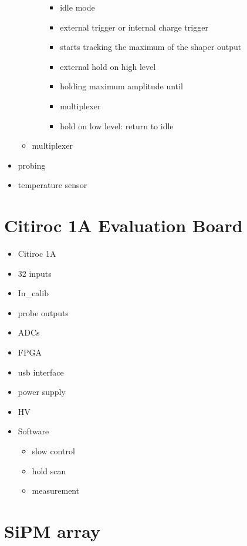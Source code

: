 \begin{itemize}
\begin{itemize}
\begin{itemize}
\begin{itemize}
                \item idle mode
                \item external trigger or internal charge trigger
                \item starts tracking the maximum of the shaper output
                \item external hold on high level
                \item holding maximum amplitude until
                \item multiplexer
                \item hold on low level: return to idle 
            \end{itemize}
        \end{itemize}
        \item multiplexer
    \end{itemize}
    \item probing
    \item temperature sensor
\end{itemize}

\section{Citiroc 1A Evaluation Board}

\begin{itemize}
    \item Citiroc 1A
    \item 32 inputs
    \item In\_calib
    \item probe outputs
    \item ADCs
    \item FPGA
    \item usb interface
    \item power supply
    \item HV
    \item Software
    \begin{itemize}
        \item slow control
        \item hold scan
        \item measurement
    \end{itemize}
\end{itemize}



\section{SiPM array}



